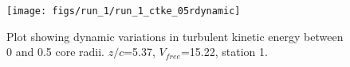 \begin{figure}[H]
\centering
\texttt{[image: figs/run\_1/run\_1\_ctke\_05rdynamic]}
\caption{Plot showing dynamic variations in turbulent kinetic energy between 0 and 0.5 core radii. $z/c$=5.37, $V_{free}$=15.22, station 1.}
\label{fig:run_1_ctke_05rdynamic}
\end{figure}



